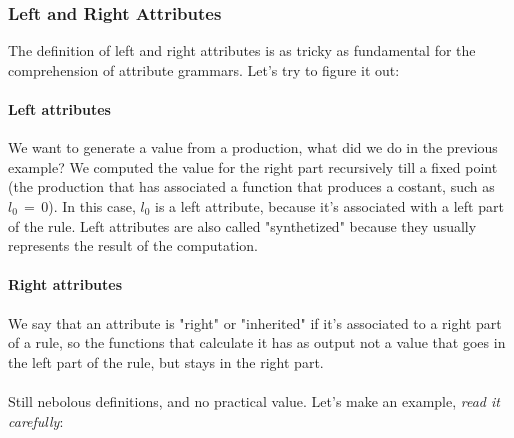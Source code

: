			\subsubsection{Left and Right Attributes}
				The definition of left and right attributes is as tricky as fundamental for the comprehension of attribute grammars. Let's try to figure it out:
				\paragraph{Left attributes}
					We want to generate a value from a production, what did we do in the previous example? We computed the value for the right part recursively till a 
					fixed point (the production that has associated a function that produces a costant, such as $l_0 \,=\, 0$). In this case, $l_0$ is a left 
					attribute, because it's associated with a left part of the rule. Left attributes are also called "synthetized" because they usually represents the 
					result of the computation.
				\paragraph{Right attributes}
					We say that an attribute is "right" or "inherited" if it's associated to a right part of a rule, so the functions that calculate it has as output 
					not a value that goes in the left part of the rule, but stays in the right part.
				\\\\Still nebolous definitions, and no practical value. Let's make an example, \emph{read it carefully}:

